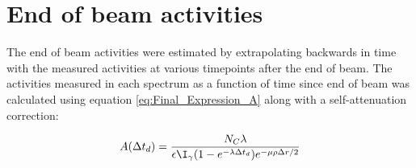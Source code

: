 \section{End of beam activities}
The end of beam activities were estimated by extrapolating backwards in time with the measured activities at various timepoints after the end of beam. The activities measured in each spectrum as a function of time since end of beam was calculated using equation \ref{eq:Final_Expression_A} along with a self-attenuation correction:

\begin{equation} \label{eq:activity_eob_matlab}
    A(\Delta t_d) = \frac{N_C\lambda}{\epsilon\I_\gamma (1-e^{-\lambda \Delta t_d})e^{-\mu\rho\Delta r/2}}
\end{equation}

